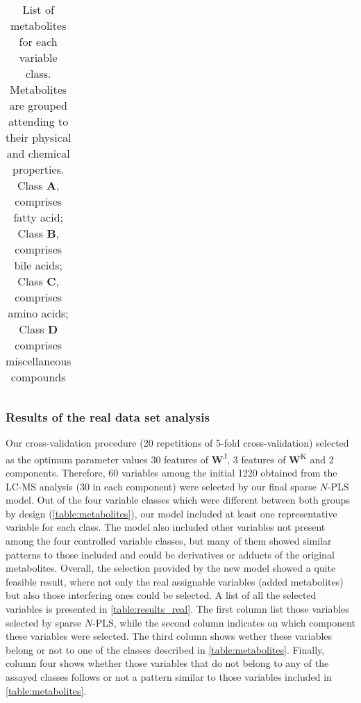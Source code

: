 \begin{table}[hbtp]
{\begin{tabular}{@{}cc@{}}
\end{tabular}}
\caption{List of metabolites for each variable class. Metabolites are grouped attending to their physical and chemical properties. Class \textbf{A}, comprises fatty acid; Class \textbf{B}, comprises bile acids; Class \textbf{C}, comprises amino acids; Class \textbf{D} comprises miscellaneous compounds}
\label{table:metabolites}
\end{table}

\subsubsection{Results of the real data set analysis}
Our cross-validation procedure (20 repetitions of 5-fold cross-validation) selected as the optimum parameter values 30 features of \textbf{W}\textsuperscript{J}, 3 features of \textbf{W}\textsuperscript{K} and 2 components. Therefore, 60 variables among the initial 1220 obtained from the LC-MS analysis (30 in each component) were selected by our final sparse $N$-PLS model. Out of the four variable classes which were different between both groups by design (\autoref{table:metabolites}), our model included at least one representative variable for each class. The model also included other variables not present among the four controlled variable classes, but many of them showed similar patterns to those included and could be derivatives or adducts of the original metabolites. Overall, the selection provided by the new model showed a quite feasible result, where not only the real assignable variables (added metabolites) but also those interfering ones could be selected. A list of all the selected variables is presented in \autoref{table:results_real}. The first column list those variables selected by sparse $N$-PLS, while  the second column indicates on which component these variables were selected. The third column shows wether these variables belong or not to one of the classes described in \autoref{table:metabolites}. Finally, column four shows whether those variables that do not belong to any of the assayed classes follows or not a pattern similar to those variables included in \autoref{table:metabolites}. 
\vspace{10pt}
